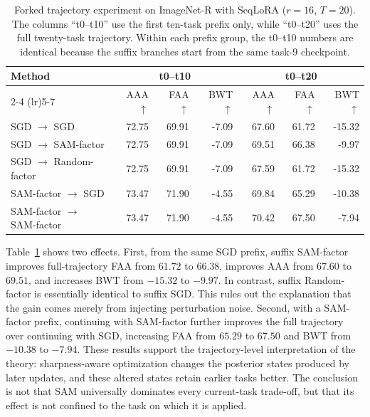 \documentclass{article}
\begin{document}
\begin{table}[t]
\centering
\small
\setlength{\tabcolsep}{4.2pt}
\caption{Forked trajectory experiment on ImageNet-R with SeqLoRA ($r=16$, $T=20$).
The columns ``t0--t10'' use the first ten-task prefix only, while ``t0--t20'' uses the full twenty-task trajectory.
Within each prefix group, the t0--t10 numbers are identical because the suffix branches start from the same task-9 checkpoint.
}
\label{tab:forked_prefix_full}
\begin{tabular}{lrrrrrr}
\toprule
Method & \multicolumn{3}{c}{t0--t10} & \multicolumn{3}{c}{t0--t20} \\
\cmidrule(lr){2-4} \cmidrule(lr){5-7}
 & AAA $\uparrow$ & FAA $\uparrow$ & BWT $\uparrow$ & AAA $\uparrow$ & FAA $\uparrow$ & BWT $\uparrow$ \\
\midrule
SGD $\rightarrow$ SGD & 72.75 & 69.91 & -7.09 & 67.60 & 61.72 & -15.32 \\
SGD $\rightarrow$ SAM-factor & 72.75 & 69.91 & -7.09 & 69.51 & 66.38 & -9.97 \\
SGD $\rightarrow$ Random-factor & 72.75 & 69.91 & -7.09 & 67.59 & 61.72 & -15.32 \\
\midrule
SAM-factor $\rightarrow$ SGD & 73.47 & 71.90 & -4.55 & 69.84 & 65.29 & -10.38 \\
SAM-factor $\rightarrow$ SAM-factor & 73.47 & 71.90 & -4.55 & 70.42 & 67.50 & -7.94 \\
\bottomrule
\end{tabular}
\end{table}

Table~\ref{tab:forked_prefix_full} shows two effects.
First, from the same SGD prefix, suffix SAM-factor improves full-trajectory FAA from $61.72$ to $66.38$, improves AAA from $67.60$ to $69.51$, and increases BWT from $-15.32$ to $-9.97$.
In contrast, suffix Random-factor is essentially identical to suffix SGD.
This rules out the explanation that the gain comes merely from injecting perturbation noise.
Second, with a SAM-factor prefix, continuing with SAM-factor further improves the full trajectory over continuing with SGD, increasing FAA from $65.29$ to $67.50$ and BWT from $-10.38$ to $-7.94$.
These results support the trajectory-level interpretation of the theory: sharpness-aware optimization changes the posterior states produced by later updates, and these altered states retain earlier tasks better.
The conclusion is not that SAM universally dominates every current-task trade-off, but that its effect is not confined to the task on which it is applied.
\end{document}
